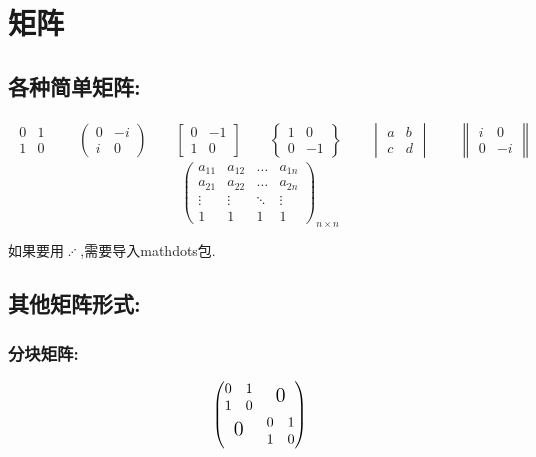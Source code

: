 \documentclass[12pt]{ctexart}
\begin{document}
\section{矩阵}
\subsection{各种简单矩阵:}
$$
\begin{gathered}
	\begin{matrix} 0 & 1 \\ 1 & 0 \end{matrix}
	\qquad
	\begin{pmatrix} 0 & -i \\ i & 0 \end{pmatrix}
	\qquad
	\begin{bmatrix} 0 & -1 \\ 1 & 0 \end{bmatrix}
	\qquad
	\begin{Bmatrix} 1 & 0 \\ 0 & -1 \end{Bmatrix}
	\qquad
	\begin{vmatrix} a & b \\ c & d \end{vmatrix}
	\qquad
	\begin{Vmatrix} i & 0 \\ 0 & -i \end{Vmatrix}
\end{gathered}
$$
\[
\begin{pmatrix}
	a_{11} & a_{12} & \dots & a_{1n} \\
	a_{21} & a_{22} & \dots & a_{2n} \\
	\vdots  & \vdots & \ddots & \vdots \\
	1 & 1 & 1 & 1
\end{pmatrix}_{n \times n}
\]

如果要用$\iddots$,需要导入mathdots包.


\subsection{其他矩阵形式:}
\subsubsection{分块矩阵:}
\[
\begin{pmatrix}
	\begin{matrix} 0 & 1 \\ 1 & 0 \end{matrix} & \text{\Large 0}\\
	\text{\Large 0} & \begin{matrix} 0 & 1 \\ 1 & 0 \end{matrix}
\end{pmatrix}
\]
\end{document}
